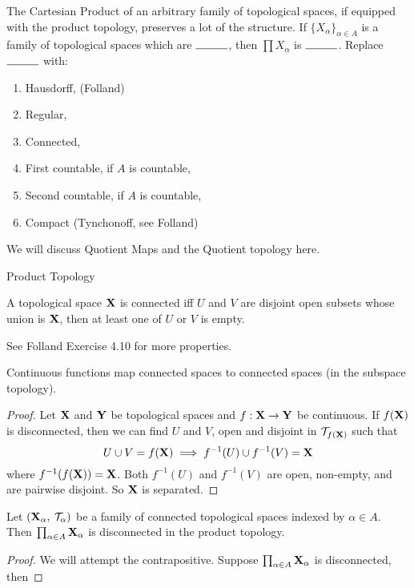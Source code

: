 \documentclass[../../main.tex]{subfiles}
\begin{document}
The Cartesian Product of an arbitrary family of topological spaces, if equipped with the product topology, preserves a lot of the structure. If $\{X_\alpha\}_{\alpha\in A}$ is a family of topological spaces which are $\rule{1cm}{0.15mm}$, then $\prod X_\alpha$ is $\rule{1cm}{0.15mm}$. Replace $\rule{1cm}{0.15mm}$ with: 

\begin{enumerate}
    \item Hausdorff, (Folland)
    \item Regular,
    \item Connected, 
    \item First countable, if $A$ is countable,
    \item Second countable, if $A$ is countable,
    \item Compact (Tynchonoff, see Folland)
\end{enumerate}



\newpage
We will discuss Quotient Maps and the Quotient topology here.



\newpage
Product Topology


\newpage


\begin{definition}\label{chp4:connectedness-definition}
    A topological space ${\mathbf{X}}$ is connected iff $U$ and $V$ are disjoint open subsets whose union is ${\mathbf{X}}$, then at least one of $U$ or $V$ is empty.
\end{definition}
See Folland Exercise 4.10 for more properties.

\begin{wts}
    Continuous functions map connected spaces to connected spaces (in the subspace topology).
\end{wts}
\begin{proof}
    Let ${\mathbf{X}}$ and ${\mathbf{Y}}$ be topological spaces and $f: {\mathbf{X}}\to{\mathbf{Y}}$ be continuous. If $f({\mathbf{X}})$ is disconnected, then we can find $U$ and $V$, open and disjoint in $\mathcal{T}_{f({\mathbf{X}})}$ such that
    \[
        U\cup V = f({\mathbf{X}})\implies f^{-1}(U)\cup f^{-1}(V) = {\mathbf{X}}
    \]
    where $f^{-1}(f({\mathbf{X}})) = {\mathbf{X}}$. Both $f^{-1}(U)$ and $f^{-1}(V)$ are open, non-empty, and are pairwise disjoint. So ${\mathbf{X}}$ is separated.
\end{proof}

\begin{wts}
    Let $({\mathbf{X}}_\alpha,\: \mathcal{T}_{\alpha})$ be a family of connected topological spaces indexed by $\alpha\in A$. Then $\prod_{\alpha\in A}{\mathbf{X}}_\alpha$ is disconnected in the product topology.
\end{wts}
\begin{proof}
    We will attempt the contrapositive. Suppose $\prod_{\alpha\in A}{\mathbf{X}}_\alpha$ is disconnected, then
\end{proof}
\end{document}

